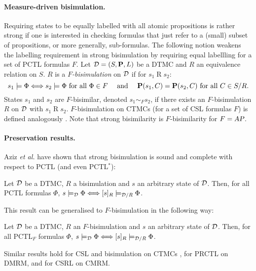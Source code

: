 \documentclass{llncs}
\begin{document}
\paragraph{Measure-driven bisimulation.}
        Requiring states to be equally labelled with all atomic propositions is rather
        strong if one is interested in checking formulas that just refer to a (small)
        subset of propositions, or more generally, sub-formulas.
        The following notion weakens the labelling requirement in strong bisimulation 
        by requiring equal labellling for a set of PCTL formulas $F$.
        Let $\mathcal{D} = (S,\mathbf{P},L)$ be a DTMC
        and $R$ an equivalence relation on $S$.
        $R$ is a \emph{$F$-bisimulation} on $\mathcal{D}$ if for $s_1 \mathrel{R} s_2$:
        \[
                s_1 \models \Phi \Longleftrightarrow s_2 \models \Phi
                \text{ for all } \Phi \in F
                \quad \text{ and } \quad
                \mathbf{P}(s_1, C) = \mathbf{P}(s_2, C)
                \text{ for all } C \in S/R.
        \]
        States $s_1$ and $s_2$ are $F$-bisimilar, denoted $s_1 \mathrel{\sim_F} s_2$,
        if there exists an $F$-bisimulation $R$ on $\mathcal{D}$ with $s_1 \mathrel{R} s_2$.
        $F$-bisimulation on CTMCs (for a set of CSL formulas $F$) is defined analogously
        \cite{BaierHHK_ICALP00}.
        Note that strong bisimilarity is $F$-bisimilarity for $F = \mbox{\sl AP}$.

\paragraph{Preservation results.}
        Aziz \emph{et al.} \cite{AzizSSBSV_CAV95} have shown that strong bisimulation is sound and complete 
        with respect to PCTL (and even PCTL$^*$):
        \begin{proposition}
                Let $\mathcal{D}$ be a DTMC, $R$ a bisimulation
                and $s$ an arbitrary state of $\mathcal{D}$.
                Then, for all PCTL formulas $\Phi$,
                $s \models_{\mathcal{D}} \Phi \Longleftrightarrow [s]_R \models_{\mathcal{D}/R} \Phi$.
        \end{proposition}
        This result can be generalised to $F$-bisimulation in the following way:
        \begin{proposition} \label{prop.f.bisim}
                Let $\mathcal{D}$ be a DTMC, $R$ an $F$-bisimulation
                and $s$ an arbitrary state of $\mathcal{D}$.
                Then, for all PCTL$_F$ formulas $\Phi$,
                $s \models_{\mathcal{D}} \Phi \Longleftrightarrow [s]_R \models_{\mathcal{D}/R} \Phi$.
        \end{proposition}
        Similar results hold for CSL and bisimulation on CTMCs \cite{BaierHHK_TSE03},
        for PRCTL on DMRM, and for CSRL on CMRM.
        
\end{document}
